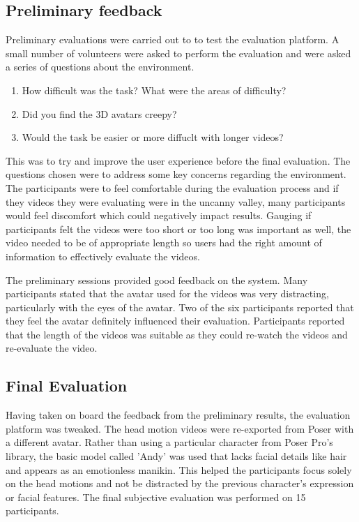 \documentclass[bsc,frontabs,twoside,singlespacing,parskip]{infthesis}
\begin{document}
\subsection{Preliminary feedback}

Preliminary evaluations were carried out to to test the evaluation platform. A small number of volunteers were asked to perform the evaluation and were asked a series of questions about the environment.

\begin{enumerate}
\item{How difficult was the task? What were the areas of difficulty?}
\item{Did you find the 3D avatars creepy?}
\item{Would the task be easier or more diffuclt with longer videos?}
\end{enumerate}

This was to try and improve the user experience before the final evaluation. The questions chosen were to address some key concerns regarding the environment. The participants were to feel comfortable during the evaluation process and if they videos they were evaluating were in the uncanny valley, many participants would feel discomfort which could negatively impact results. Gauging if participants felt the videos were too short or too long was important as well, the video needed to be of appropriate length so users had the right amount of information to effectively evaluate the videos.

The preliminary sessions provided good feedback on the system. Many participants stated that the avatar used for the videos was very distracting, particularly with the eyes of the avatar. Two of the six participants reported that they feel the avatar definitely influenced their evaluation. Participants reported that the length of the videos was suitable as they could re-watch the videos and re-evaluate the video.

\subsection{Final Evaluation}

Having taken on board the feedback from the preliminary results, the evaluation platform was tweaked. The head motion videos were re-exported from Poser with a different avatar. Rather than using a particular character from Poser Pro's library, the basic model called 'Andy' was used that lacks facial details like hair and appears as an emotionless manikin. This helped the participants focus solely on the head motions and not be distracted by the previous character's expression or facial features. The final subjective evaluation was performed on 15 participants.
\end{document}
